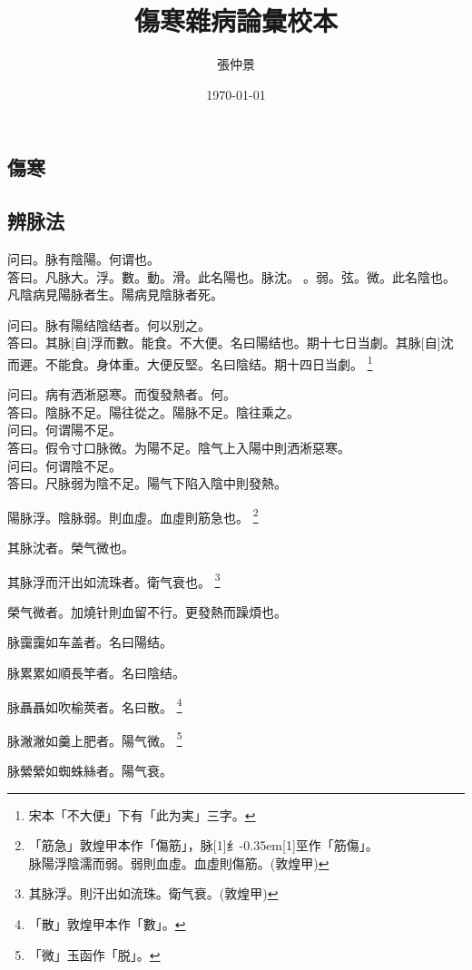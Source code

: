 \documentclass[11pt,oneside,b5paper]{ctexbook}
\title{傷寒雜病論彙校本}
\author{張仲景}
\date{\today}
\begin{document}
\maketitle
\tableofcontents
\begin{flushleft}
\part{傷寒}

\chapter{辨脉法}

问曰。脉有陰陽。何谓也。\\
答曰。凡脉大。浮。數。動。滑。此名陽也。脉沈。{𬈧}。弱。弦。微。此名陰也。凡陰病見陽脉者生。陽病見陰脉者死。

问曰。脉有陽结陰结者。何以别之。\\
答曰。其脉[自]浮而數。能食。不大便。名曰陽结也。期十七日当劇。其脉[自]沈而遲。不能食。身体重。大便反堅。名曰陰结。期十四日当劇。
\footnote{宋本「不大便」下有「此为実」三字。}

问曰。病有洒淅惡寒。而復發熱者。何。\\
答曰。陰脉不足。陽往從之。陽脉不足。陰往乘之。\\
问曰。何谓陽不足。\\
答曰。假令寸口脉微。为陽不足。陰气上入陽中則洒淅惡寒。\\
问曰。何谓陰不足。\\
答曰。尺脉弱为陰不足。陽气下陷入陰中則發熱。

陽脉浮。陰脉弱。則血虛。血虛則筋急也。
\footnote{「筋急」敦煌甲本作「傷筋」，脉{\hbox{\scalebox{0.68}[1]{纟}\kern-0.35em\scalebox{0.64}[1]{巠}}}作「筋傷」。\\脉陽浮陰濡而弱。弱則血虛。血虛則傷筋。(敦煌甲)}

其脉沈者。榮气微也。

其脉浮而汗出如流珠者。衛气衰也。
\footnote{其脉浮。則汗出如流珠。衛气衰。(敦煌甲)}

榮气微者。加燒针則血留不行。更發熱而躁煩也。

脉靄靄如车盖者。名曰陽结。

脉累累如順長竿者。名曰陰结。

脉聶聶如吹榆莢者。名曰散。
\footnote{「散」敦煌甲本作「數」。}

脉潎潎如羹上肥者。陽气微。
\footnote{「微」玉函作「脱」。}

脉縈縈如蜘蛛絲者。陽气衰。


\end{flushleft}
\end{document}
